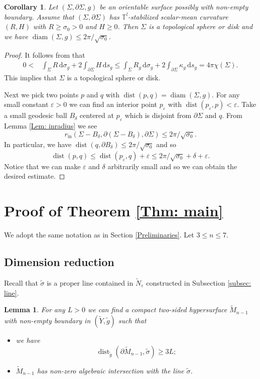 \documentclass[11pt,letterpaper]{amsart}
\numberwithin{equation}{section}
\newtheorem{lemma}[theorem]{Lemma}
\newtheorem{corollary}[theorem]{Corollary}
\theoremstyle{definition}
\DeclareMathOperator{\dist}{dist}
\DeclareMathOperator{\diam}{diam}
\newcommand{\ve}{\varepsilon}
\begin{document}
\begin{corollary}\label{Cor: diameter}
Let $(\Sigma,\partial\Sigma,g)$ be an orientable surface possibly with non-empty boundary. Assume that $(\Sigma,\partial\Sigma)$ has $\mathbb T^l$-stabilized scalar-mean curvature $(R,H)$ with $R\geq \sigma_0>0$ and $H\geq 0$.
Then $\Sigma$ is a topological sphere or disk and we have $\diam(\Sigma,g)\leq 2\pi/\sqrt{\sigma_0}$.
\end{corollary}
\begin{proof}
It follows from \cite[formula (2.6)]{GZ21} that
\[
\begin{split}
0<&\int_{\Sigma} R\,\mathrm d\sigma_g+2\int_{\partial\Sigma}H\,\mathrm ds_g \leq  \int_{\Sigma} R_g\,\mathrm d\sigma_g+2\int_{\partial\Sigma}\kappa_g\,\mathrm ds_g=4\pi\chi(\Sigma).
\end{split}
\]
This implies that $\Sigma$ is a topological sphere or disk.

Next we pick two points $p$ and $q$ with $\dist(p,q)=\diam(\Sigma,g)$. For any small constant $\ve>0$ we can find an interior point $p_\ve$ with $\dist(p_\ve,p)<\ve$. Take a small geodesic ball $B_\delta$ centered at $p_\ve$ which is disjoint from $\partial\Sigma$ and $q$. From Lemma \ref{Lem: inradius} we see
$$r_{\mathrm{in}}(\Sigma-B_\delta, \partial(\Sigma-B_\delta),\partial\Sigma)\leq 2\pi/\sqrt{\sigma_0}.$$ In particular, we have $\dist(q,\partial B_\delta)\leq 2\pi/\sqrt{\sigma_0}$ and so
$$
\dist(p,q)\leq \dist(p_\ve,q)+\ve\leq 2\pi/\sqrt{\sigma_0}+\delta+\ve.
$$
Notice that we can make $\ve$ and $\delta$ arbitrarily small and so we can obtain the desired estimate.
\end{proof}




\section{Proof of Theorem \ref{Thm: main}}\label{Proof of main theorem}
We adopt the same notation as in Section \ref{Preliminaries}. Let $3 \le n \le 7$.

\subsection{Dimension reduction}
Recall that $\tilde{\sigma}$ is a proper line contained in $\tilde{N}_\ve$ constructed in Subsection \ref{subsec: line}.
\begin{lemma}
For any $L>0$ we can find a compact two-sided hypersurface $\tilde M_{n-1}$ with non-empty boundary in $(\tilde Y,\tilde g)$ such that
\begin{itemize}\setlength{\itemsep}{1mm}
\item we have
$$
\dist_{\tilde g}(\partial \tilde M_{n-1},\tilde \sigma)\geq 3L;
$$
\item $\tilde M_{n-1}$ has non-zero algebraic intersection with the line $\tilde \sigma$.
\end{itemize}
\end{lemma}
\end{document}

